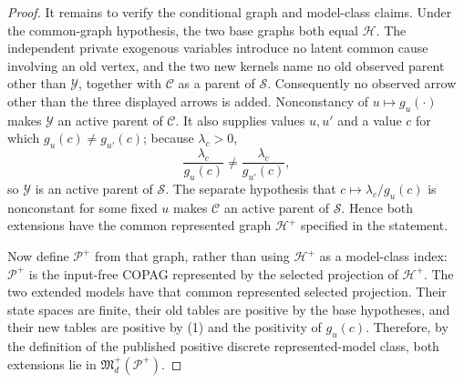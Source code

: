 \documentclass{article}
\begin{document}
\begin{proof}
It remains to verify the conditional graph and model-class claims. Under the common-graph hypothesis, the two base graphs both equal \(\mathcal H\). The independent private exogenous variables introduce no latent common cause involving an old vertex, and the two new kernels name no old observed parent other than \(\mathcal Y\), together with \(\mathcal C\) as a parent of \(\mathcal S\). Consequently no observed arrow other than the three displayed arrows is added. Nonconstancy of \(u\mapsto g_u(\cdot)\) makes \(\mathcal Y\) an active parent of \(\mathcal C\). It also supplies values \(u,u'\) and a value \(c\) for which \(g_u(c)\ne g_{u'}(c)\); because \(\lambda_c>0\),
\[
 \frac{\lambda_c}{g_u(c)}
 \ne
 \frac{\lambda_c}{g_{u'}(c)},                            \tag{11}
\]
so \(\mathcal Y\) is an active parent of \(\mathcal S\). The separate hypothesis that \(c\mapsto\lambda_c/g_u(c)\) is nonconstant for some fixed \(u\) makes \(\mathcal C\) an active parent of \(\mathcal S\). Hence both extensions have the common represented graph \(\mathcal H^+\) specified in the statement.

Now define \(\mathcal P^+\) from that graph, rather than using \(\mathcal H^+\) as a model-class index: \(\mathcal P^+\) is the input-free COPAG represented by the selected projection of \(\mathcal H^+\). The two extended models have that common represented selected projection. Their state spaces are finite, their old tables are positive by the base hypotheses, and their new tables are positive by (1) and the positivity of \(g_u(c)\). Therefore, by the definition of the published positive discrete represented-model class, both extensions lie in \(\mathfrak M_d^+(\mathcal P^+)\).


\end{proof}
\end{document}
